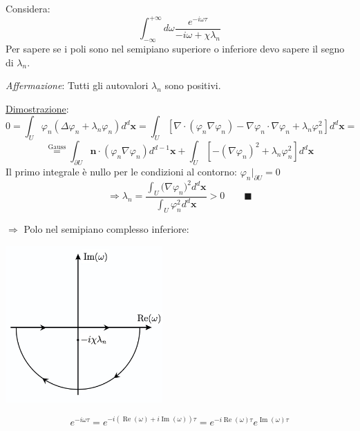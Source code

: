 \documentclass[a4paper,11pt]{report}
\newcommand{\x}{\boldsymbol{x}}
\newcommand{\n}{\boldsymbol{n}}
\begin{document}
Considera:
\[
\int_{-\infty}^{+\infty} d\omega \frac{e^{-i\omega \tau}}{-i\omega +\chi\lambda_n}
\]
Per sapere se i poli sono nel semipiano superiore o inferiore devo sapere il segno di $\lambda_n$.

\medskip

\emph{Affermazione}: Tutti gli autovalori $\lambda_n$ sono positivi.

\underline{Dimostrazione}:
\[
0=\int_{U}\varphi_n(\Delta\varphi_n+\lambda_n\varphi_n)d^d\x=
\int_{U}\left[ \nabla \cdot(\varphi_n \nabla \varphi_n)- \nabla \varphi_n \cdot \nabla \varphi_n + \lambda_n\varphi_n^2\right]d^d\x=
\]
\[
\overset{\text{Gauss}}{=}\int_{\partial U}\n \cdot(\varphi_n \nabla \varphi_n)d^{d-1}\x + \int_{U}\left[-(\nabla \varphi_n)^2 +\lambda_n\varphi_n^2 \right]d^d\x
\]
Il primo integrale \`e nullo per le condizioni al contorno: $\varphi_n\big|_{\partial U}=0$
\[
\Rightarrow \lambda_n=\frac{\int_{U}\big(\nabla \varphi_n\big)^2d^d\x}{\int_U\varphi_n^2 d^d\x}>0 \qquad \blacksquare
\]

\medskip

$\Rightarrow$ Polo nel semipiano complesso inferiore:
\begin{center}
\includegraphics[width=0.45\textwidth]{immagini/complex1}
\end{center}
\[
e^{-i\omega\tau}=e^{-i(\operatorname{Re}(\omega) + i \operatorname{Im}(\omega))\tau}=e^{-i\operatorname{Re}(\omega)\tau }e^{\operatorname{Im}(\omega)\tau}
\]
\end{document}
